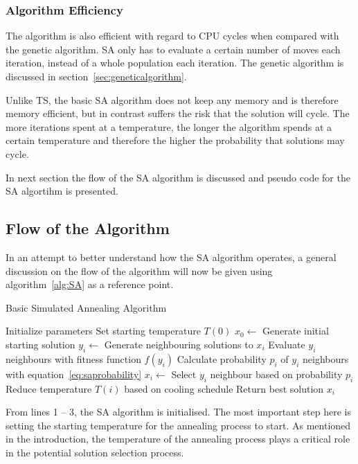 \subsubsection{Algorithm Efficiency}
The algorithm is also efficient with regard to CPU cycles when compared with the genetic algorithm. \gls{SA} only has to evaluate a certain number of moves each iteration, instead of a whole population each iteration. The genetic algorithm is discussed in section~\ref{sec:geneticalgorithm}.

Unlike \gls{TS}, the basic \gls{SA} algorithm does not keep any memory and is therefore memory efficient, but in contrast suffers the risk that the solution will cycle. The more iterations spent at a temperature, the longer the algorithm spends at a certain temperature and therefore the higher the probability that solutions may cycle.

In next section the flow of the \gls{SA} algorithm is discussed and pseudo code for the \gls{SA} algortihm is presented.

\subsection{Flow of the Algorithm}
In an attempt to better understand how the \gls{SA} algorithm operates, a general discussion on the flow of the algorithm will now be given using algorithm~\ref{alg:SA} as a reference point.
\begin{algorithm}[H]
\caption{Basic Simulated Annealing Algorithm\cite{VeryFastSAImageEnchancement,ChaosSA}}
\label{alg:SA}
	\begin{algorithmic}[1]
		\State Initialize parameters
		\State Set starting temperature $T(0)$
		\State $x_0 \leftarrow$ Generate initial starting solution
			\State $y_i \leftarrow$ Generate neighbouring solutions to $x_i$
			\State Evaluate $y_i$ neighbours with fitness function $f(y_i)$
			\State Calculate probability $p_i$ of $y_i$ neighbours with equation~\ref{eq:saprobability}
			\State $x_i \leftarrow$ Select $y_i$ neighbour based on probability $p_i$
			\State Reduce temperature $T(i)$ based on cooling schedule
		\EndWhile
		\State Return best solution $x_i$
	\end{algorithmic}
\end{algorithm}

From lines 1 -- 3, the \gls{SA} algorithm is initialised. The most important step here is setting the starting temperature for the annealing process to start. As mentioned in the introduction, the temperature of the annealing process plays a critical role in the potential solution selection process.

